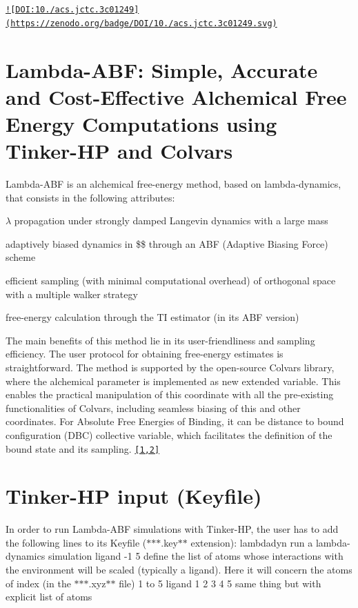 \href{https://doi.org/10.1021/acs.jctc.3c01249}{\tt !\mbox{[}D\-O\-I\-:10./acs.jctc.\-3c01249\mbox{]}(https\-://zenodo.\-org/badge/\-D\-O\-I/10./acs.\-jctc.\-3c01249.\-svg)}

\section*{Lambda-\/\-A\-B\-F\-: Simple, Accurate and Cost-\/\-Effective Alchemical Free Energy Computations using Tinker-\/\-H\-P and Colvars}

Lambda-\/\-A\-B\-F is an alchemical free-\/energy method, based on lambda-\/dynamics, that consists in the following attributes\-:
\begin{DoxyEnumerate}
\item $ \lambda $ propagation under strongly damped Langevin dynamics with a large mass
\item adaptively biased dynamics in \$\$ through an A\-B\-F (Adaptive Biasing Force) scheme
\item efficient sampling (with minimal computational overhead) of orthogonal space with a multiple walker strategy
\item free-\/energy calculation through the T\-I estimator (in its A\-B\-F version)
\end{DoxyEnumerate}

The main benefits of this method lie in its user-\/friendliness and sampling efficiency. The user protocol for obtaining free-\/energy estimates is straightforward. The method is supported by the open-\/source Colvars library, where the alchemical parameter is implemented as new extended variable. This enables the practical manipulation of this coordinate with all the pre-\/existing functionalities of Colvars, including seamless biasing of this and other coordinates. For Absolute Free Energies of Binding, it can be distance to bound configuration (D\-B\-C) collective variable, which facilitates the definition of the bound state and its sampling. \href{#1,#2}{\tt \mbox{[}1,2\mbox{]}}

\section*{Tinker-\/\-H\-P input (Keyfile)}

In order to run Lambda-\/\-A\-B\-F simulations with Tinker-\/\-H\-P, the user has to add the following lines to its Keyfile ($\ast$$\ast$$\ast$.key$\ast$$\ast$ extension)\-: {\ttfamily lambdadyn} run a lambda-\/dynamics simulation {\ttfamily ligand -\/1 5} define the list of atoms whose interactions with the environment will be scaled (typically a ligand). Here it will concern the atoms of index (in the $\ast$$\ast$$\ast$.xyz$\ast$$\ast$ file) 1 to 5 {\ttfamily ligand 1 2 3 4 5} same thing but with explicit list of atoms

